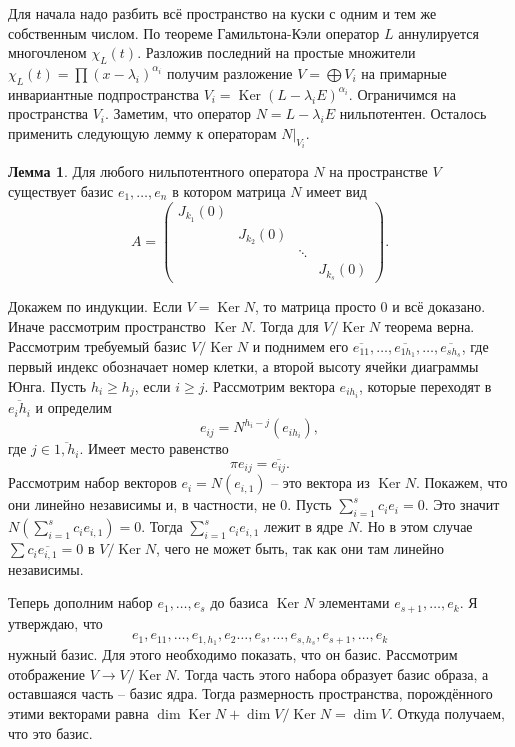 \documentclass[10pt,a4paper,oneside]{book}
\theoremstyle{definition}
\newtheorem{lem}{Лемма}
\newcommand{\ovl}{\overline}
\DeclareMathOperator{\Ker}{Ker}
\def\lm{\begin{lem}}
\def\elm{\end{lem}}
\begin{document}
\proof[Существование]


Для начала надо разбить всё пространство на куски с одним и тем же собственным числом. По теореме Гамильтона-Кэли оператор $L$ аннулируется многочленом $\chi_L(t)$. Разложив последний на простые множители $\chi_L(t)=\prod (x-\lambda_i)^{\alpha_i}$ получим разложение $V=\bigoplus V_i$ на примарные инвариантные подпространства $V_i=\Ker (L-\lambda_i E)^{\alpha_i}$. Ограничимся на пространства $V_i$. Заметим, что оператор $N=L-\lambda_i E$ нильпотентен. Осталось применить следующую  лемму к операторам $N|_{V_i}$.

\lm Для любого нильпотентного оператора $N$ на пространстве $V$ существует базис $e_1,\dots,e_n$ в котором матрица $N$ имеет вид
$$A=\begin{pmatrix}
J_{k_1}(0) &&&\\
& J_{k_2}(0) &&\\
&& \ddots& \\
&&& J_{k_s}(0)
\end{pmatrix}.
$$
\elm
\proof
Докажем по индукции. Если $V=\Ker N$, то матрица просто 0 и всё доказано. Иначе рассмотрим пространство $\Ker N$. Тогда для $V/\Ker N$ теорема верна. Рассмотрим требуемый базис $V/\Ker N$ и поднимем его $\ovl{e_{11}},\dots,\ovl{e_{1h_1}},\dots, \ovl{e_{sh_s}}$, где первый индекс обозначает номер клетки, а второй высоту ячейки диаграммы Юнга. Пусть $h_i\geq h_j$, если $i\geq j$.
Рассмотрим вектора $e_{ih_i}$, которые переходят в $\ovl{e_ih_i}$ и определим $$e_{ij}=N^{h_i-j}(e_{ih_i}),$$ где  $j\in \ovl{1,h_i}$. Имеет место равенство $$\pi{e_{ij}}=\ovl{e_{ij}}.$$
Рассмотрим набор векторов $e_i=N(e_{i,1})$ -- это вектора из $\Ker N$.
Покажем, что они линейно независимы и, в частности, не 0. Пусть $\sum_{i=1}^s c_ie_i=0$. Это значит $N(\sum_{i=1}^s c_i e_{i,1} )=0$. Тогда $\sum_{i=1}^s c_i e_{i,1} $ лежит в ядре $N$. Но в этом случае $\sum c_i \ovl{e_{i,1}}=0$ в $V/\Ker N$, чего не может быть, так как они там линейно независимы.

Теперь дополним набор $e_1,\dots,e_s$ до базиса $\Ker N$  элементами $e_{s+1},\dots,e_k$. Я утверждаю, что $$e_1, e_{11},\dots, e_{1,h_1},e_2\dots, e_s, \dots, e_{s,h_s}, e_{s+1},\dots, e_k$$
нужный базис. Для этого необходимо показать, что он базис. Рассмотрим отображение $V \to V/\Ker N$. Тогда часть этого набора образует базис образа, а оставшаяся часть -- базис ядра. Тогда размерность пространства, порождённого этими векторами равна $\dim \Ker N + \dim V/\Ker N = \dim V$. Откуда получаем, что это базис.
\endproof
\end{document}
